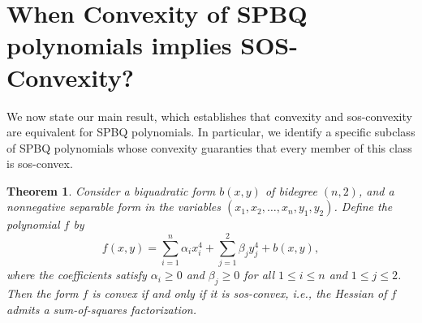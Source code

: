 \documentclass[12pt]{elsarticle}
\newtheorem{theorem}{Theorem}[section]
\theoremstyle{definition}
\begin{document}
\section{When Convexity of SPBQ polynomials implies SOS-Convexity?}\label{convex spbq}
We now state our main result, which establishes that convexity and sos-convexity are equivalent for SPBQ polynomials. In particular, we identify a specific subclass of SPBQ polynomials whose convexity guaranties that every member of this class is sos-convex.
\begin{theorem}
 Consider a biquadratic form \(b(x,y)\) of bidegree \( (n,2) \), and a nonnegative separable form in the variables \((x_1, x_2, \dots, x_n, y_1, y_2)\). Define the polynomial \(f\) by
\[
f(x,y) = \sum_{i=1}^n \alpha_i x_i^4 + \sum_{j=1}^2 \beta_j y_j^4 + b(x,y),
\]
where the coefficients satisfy \(\alpha_i \geq 0\) and \(\beta_j \geq 0\) for all \(1 \le i \le n\) and \(1 \le j \le 2\). Then the form \(f\) is convex if and only if it is sos-convex, i.e., the Hessian of \(f\) admits a sum-of-squares factorization.
\end{theorem}
\end{document}
